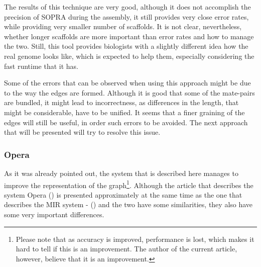 \documentclass[11pt]{article}
\begin{document}
The results of this technique are very good, although it does not accomplish the
precision of SOPRA during the assembly, it still provides very close error
rates, while providing very smaller number of scaffolds. It is not clear,
nevertheless, whether longer scaffolds are more important than error rates and
how to manage the two. Still, this tool provides biologists with a slightly
different idea how the real genome looks like, which is expected to help them,
especially considering the fast runtime that it has.

Some of the errors that can be observed when using this approach might be due to
the way the edges are formed. Although it is good that some of the mate-pairs
are bundled, it might lead to incorrectness, as differences in the length, that
might be considerable, have to be unified. It seems that a finer graining of the
edges will still be useful, in order such errors to be avoided. The next
approach that will be presented will try to resolve this issue.





\subsubsection{Opera} %
\label{ssub:Opera}
As it was already pointed out, the system that is described here manages to
improve the representation of the graph\footnote{Please note that as accuracy is
improved, performance is lost, which makes it hard to tell if this is an
improvement. The author of the current article, however, believe that it is an
improvement.}. Although the article that describes the system Opera
(\cite{Opera}) is presented approximately at the same time as the one that
describes the MIR system - (\cite{MIR}) and the two have some similarities, they
also have some very important differences.
\end{document}
